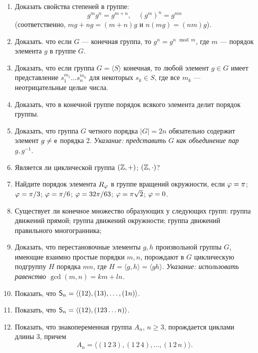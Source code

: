 \begin{enumerate}
\item Доказать свойства степеней в группе:
$$
g^mg^n=g^{m+n},\quad (g^m)^n = g^{mn}
$$
(соответственно, $mg+ng=(m+n)g$ и $n(mg)=(nm)g$).

\item Доказать. что если $G$ --- конечная группа, то $g^n = g^{n\mod m}$, где $m$ --- порядок элемента $g$ в группе $G$.

\item Доказать, что если группа $G=\langle S\rangle$ конечная, то любой элемент $g\in G$ имеет представление $s_1^{m_1}\dots s_n^{m_n}$ для некоторых $s_k\in S$, где все $m_k$ --- неотрицательные целые числа.

\item Доказать, что в конечной группе порядок всякого элемента делит порядок группы.

\item Доказать, что группа $G$ четного порядка $|G|=2n$ обязательно содержит элемент $g\ne\mathsf e$ порядка 2. \textsl{Указание: представить $G$ как объединение пар $g,g^{-1}$}.

\item Является ли циклической группа \ipunkt $(\mathbb Z,+)$; \ipunkt $(\mathbb Z,\cdot)$?

\item Найдите порядок элемента $R_\varphi$ в группе вращений окружности, если \ipunkt $\varphi=\pi$; \ipunkt $\varphi=\pi/3$; \ipunkt $\varphi=\pi/6$; \ipunkt $\varphi=32\pi/63$; \ipunkt $\varphi=\pi\sqrt 2$; \ipunkt $\varphi=0$.

\item Существует ли конечное множество образующих у следующих групп: \ipunkt группа движений прямой; \ipunkt группа движений окружности; \ipunkt группа движений правильного многогранника;

\item Доказать, что перестановочные элементы $g,h$ произвольной группы $G$, имеющие взаимно простые порядки $m,n$, порождают в $G$ циклическую подгруппу $H$ порядка $mn$, где $H=\langle g,h\rangle=\langle gh\rangle$. \textsl{Указание: использовать равенство $\gcd(m,n)=km+ln$.}

\item Показать, что ${\mathsf{S}}_n = \langle (12),(13),\dots,(1n)\rangle$.
\item Показать, что ${\mathsf{S}}_n = \langle (12),(123\dots n)\rangle$.
\item Показать, что знакопеременная группа $A_n$, $n\ge 3$, порождается циклами длины 3, причем
$$
A_n = \langle (1\,2\,3), (1\,2\,4), \dots, (1\,2\,n) \rangle.
$$


\end{enumerate}

